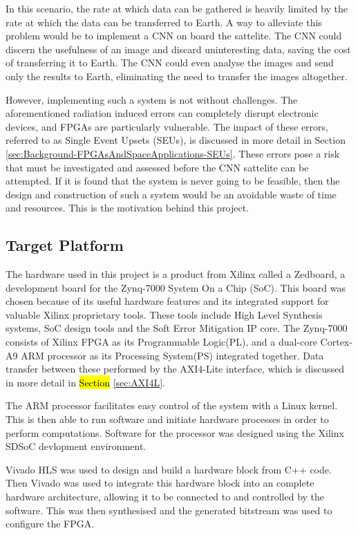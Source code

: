 \documentclass[12pt]{article}
\begin{document}
In this scenario, the rate at which data can be gathered is heavily limited by the rate at which the data can be transferred to Earth. A way to alleviate this problem would be to implement a CNN on board the sattelite. The CNN could discern the usefulness of an image and discard uninteresting data, saving the cost of transferring it to Earth. The CNN could even analyse the images and send only the results to Earth, eliminating the need to transfer the images altogether. 

However, implementing such a system is not without challenges. The aforementioned radiation induced errors can completely disrupt electronic devices, and FPGAs are particularly vulnerable. The impact of these errors, referred to as Single Event Upsets (SEUs), is discussed in more detail in Section \ref{sec:Background-FPGAsAndSpaceApplications-SEUs}. These errors pose a risk that must be investigated and assessed before the CNN sattelite can be attempted. If it is found that the system is never going to be feasible, then the design and construction of such a system would be an avoidable waste of time and resources. This is the motivation behind this project.

\subsection{Target Platform}
\label{sec:Background-TargetPlatform}


The hardware used in this project is a product from Xilinx called a Zedboard, a development board for the Zynq-7000 System On a Chip (SoC). This board was chosen because of its useful hardware features and its integrated support for valuable Xilinx proprietary tools. These tools include High Level Synthesis systems, SoC design tools and the Soft Error Mitigation IP core. The Zynq-7000 consists of Xilinx FPGA as its Programmable Logic(PL), and a dual-core Cortex-A9 ARM processor as its Processing System(PS) integrated together. Data transfer between these performed by the AXI4-Lite interface, which is discussed in more detail in \hl{Section} \ref{sec:AXI4L}.

The ARM processor facilitates easy control of the system with a Linux kernel. This is then able to run software and initiate hardware processes in order to perform computations. Software for the processor was designed using the Xilinx SDSoC devlopment environment.

Vivado HLS was used to design and build a hardware block from C++ code. Then Vivado was used to integrate this hardware block into an complete hardware architecture, allowing it to be connected to and controlled by the software. This was then synthesised and the generated bitstream was used to configure the FPGA.
\end{document}
